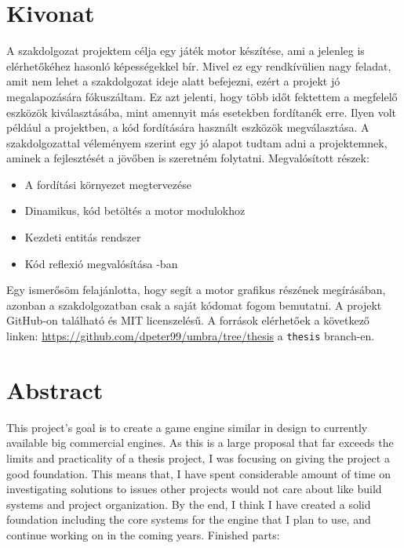 \setcounter{page}{1}

\selecthungarian

\chapter*{Kivonat}

A szakdolgozat projektem célja egy játék motor készítése, ami a jelenleg is elérhetőkéhez hasonló képességekkel bír.
Mivel ez egy rendkívülien nagy feladat, amit nem lehet a szakdolgozat ideje alatt befejezni, ezért a projekt jó megalapozására fókuszáltam.
Ez azt jelenti, hogy több időt fektettem a megfelelő eszközök kiválasztásába, mint amennyit más esetekben fordítanék erre.
Ilyen volt például a projektben, a kód fordítására használt eszközök megválasztása.
A szakdolgozattal véleményem szerint egy jó alapot tudtam adni a projektemnek, aminek a fejlesztését a jövőben is szeretném folytatni.
Megvalósított részek:

\begin{itemize}
    \item A fordítási környezet megtervezése
    \item Dinamikus, kód betöltés a motor modulokhoz
    \item Kezdeti entitás rendszer
    \item Kód reflexió megvalósítása \Cpp-ban
\end{itemize}

Egy ismerősöm felajánlotta, hogy segít a motor grafikus részének megírásában, azonban a szakdolgozatban csak a saját kódomat fogom bemutatni.
A projekt GitHub-on található és MIT licenszelésű.
A források elérhetőek a következő linken: \url{https://github.com/dpeter99/umbra/tree/thesis} a \verb|thesis| branch-en.


\vfill
\selectenglish


\chapter*{Abstract}

This project's goal is to create a game engine similar in design to currently available big commercial engines.
As this is a large proposal that far exceeds the limits and practicality of a thesis project, I was focusing on giving the project a good foundation.
This means that, I have spent considerable amount of time on investigating solutions to issues other projects would not care about like build systems and project organization.
By the end, I think I have created a solid foundation including the core systems for the engine that I plan to use, and continue working on in the coming years.
Finished parts:

